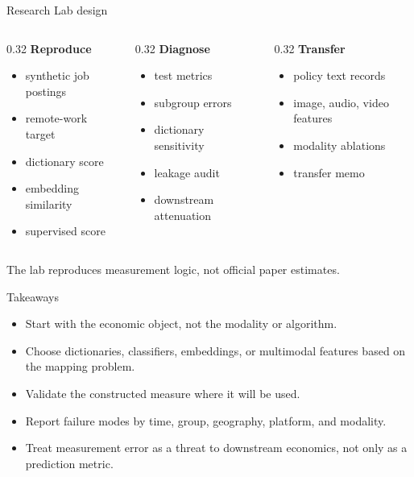 \documentclass[aspectratio=169,11pt]{beamer}
\newcommand{\1}{\mathbf{1}}
\begin{document}
\begin{frame}{Research Lab design}
\begin{columns}[T,onlytextwidth]
\begin{column}{0.32\linewidth}
\textbf{Reproduce}
\begin{itemize}
    \item synthetic job postings
    \item remote-work target
    \item dictionary score
    \item embedding similarity
    \item supervised score
\end{itemize}
\end{column}
\begin{column}{0.32\linewidth}
\textbf{Diagnose}
\begin{itemize}
    \item test metrics
    \item subgroup errors
    \item dictionary sensitivity
    \item leakage audit
    \item downstream attenuation
\end{itemize}
\end{column}
\begin{column}{0.32\linewidth}
\textbf{Transfer}
\begin{itemize}
    \item policy text records
    \item image, audio, video features
    \item modality ablations
    \item transfer memo
\end{itemize}
\end{column}
\end{columns}

\medskip
The lab reproduces measurement logic, not official paper estimates.
\end{frame}

\begin{frame}{Takeaways}
\begin{itemize}
    \item Start with the economic object, not the modality or algorithm.
    \item Choose dictionaries, classifiers, embeddings, or multimodal features based on the mapping problem.
    \item Validate the constructed measure where it will be used.
    \item Report failure modes by time, group, geography, platform, and modality.
    \item Treat measurement error as a threat to downstream economics, not only as a prediction metric.
\end{itemize}
\end{frame}
\end{document}
